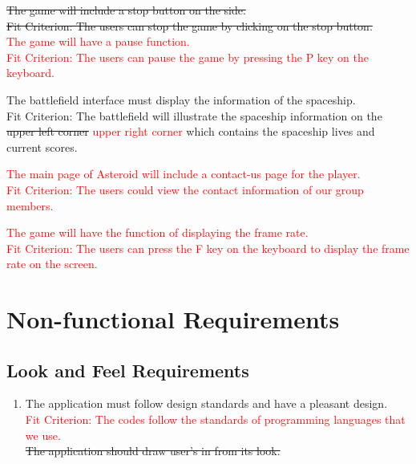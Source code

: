 \documentclass[12pt, titlepage]{article}
\begin{document}
\begin{enumerate}[{FR}1.]
  \item \sout{ The game will include a stop button on the side. \\ Fit Criterion: The users can stop the game by clicking on the stop button.\\ }
	\textcolor{red}{The game will have a pause function.\\
	Fit Criterion: The users can pause the game by pressing the P key on the keyboard.}
	\item The battlefield interface must display the information of the spaceship.\\
         Fit Criterion: The battlefield will illustrate the spaceship information on the \sout{upper left corner} \textcolor{red}{upper right corner} which contains the spaceship lives and current scores.
        \textcolor{red}{\item The main page of Asteroid will include a contact-us page for the player.\\
	Fit Criterion: The users could view the contact information of our group members.}
		\textcolor{red}{\item The game will have the function of displaying the frame rate. \\ Fit Criterion: The users can press the F key on the keyboard to display the frame rate on the screen.}
\end{enumerate}

\section{Non-functional Requirements}

\subsection{Look and Feel Requirements}
\begin{enumerate}

    \item The application must follow design standards and have a pleasant design.\\
\textcolor{red}{Fit Criterion: The codes follow the standards of programming languages that we use.}
    \sout{\\The application should draw user's in from its look.}
\end{enumerate}
\end{document}
